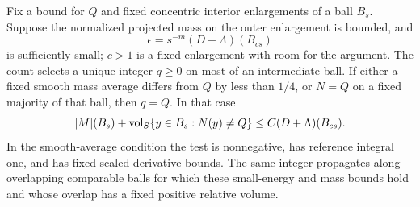 \begin{lemma}\label{lt:scalar}
Fix a bound for $Q$ and fixed concentric interior enlargements of a ball
$B_s$.  Suppose the normalized projected mass on the outer enlargement is
bounded, and
\[
 \epsilon=s^{-m}(D+\Lambda)(B_{cs})
\]
is sufficiently small; $c>1$ is a fixed enlargement with room for the
argument.  The count selects a unique integer $q\ge0$ on most of an
intermediate ball.  If either a fixed smooth mass average differs from $Q$
by less than $1/4$, or $N=Q$ on a fixed majority of that ball, then $q=Q$.
In that case
\begin{equation}\label{eq:lt-scalar-mass}
 |M|(B_s)+\operatorname{vol}_S\{y\in B_s:N(y)\ne Q\}
                       \le C(D+\Lambda)(B_{cs}).
\end{equation}
In the smooth-average condition the test is nonnegative, has reference
integral one, and has fixed scaled derivative bounds.  The same integer
propagates along overlapping comparable balls for which these small-energy
and mass bounds hold and whose overlap has a fixed positive relative
volume.
\end{lemma}

